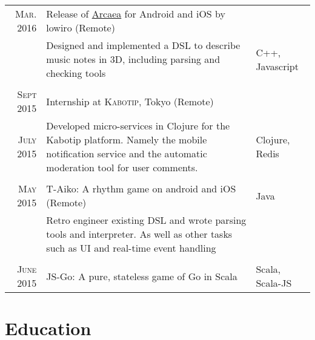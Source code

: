 \documentclass[a4paper,10pt]{article} %
\begin{document}
\begin{tabular}{r|p{9.3cm}|l}

\textsc{Mar. 2016}  & Release of \href{https://arcaea.lowiro.com}{Arcaea} for Android and iOS by lowiro (Remote)& \\
&  \footnotesize{Designed and implemented a DSL to describe music notes in 3D, including parsing and checking tools}& C++, Javascript\\\\


\textsc{Sept 2015} & Internship at \textsc{Kabotip}, Tokyo (Remote) \emph{}\\
\textsc{July 2015} & \footnotesize{Developed micro-services in Clojure for the Kabotip platform. Namely the mobile notification service and the automatic moderation tool for user comments.} & Clojure, Redis\\\\
\textsc{May} 2015 & T-Aiko: A rhythm game on android and iOS (Remote) & Java\\
& \footnotesize{Retro engineer existing DSL and wrote parsing tools and interpreter. As well as other tasks such as UI and real-time event handling} & \\\\

\textsc{June 2015} & JS-Go: A pure, stateless game of Go in Scala & Scala, Scala-JS\\

\end{tabular}


\section{Education}
\end{document}
